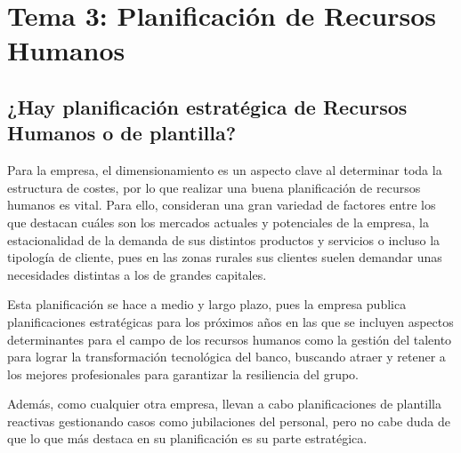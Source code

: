 %
%

\chapter{Tema 3: Planificación de Recursos Humanos}


\section{¿Hay planificación estratégica de Recursos Humanos o de plantilla?}

Para la empresa, el dimensionamiento es un aspecto clave al determinar toda la estructura de costes, por lo que realizar una buena planificación de recursos humanos es vital. Para ello, consideran una gran variedad de factores entre los que destacan cuáles son los mercados actuales y potenciales de la empresa, la estacionalidad de la demanda de sus distintos productos y servicios o incluso la tipología de cliente, pues en las zonas rurales sus clientes suelen demandar unas necesidades distintas a los de grandes capitales.

\vspace{0.5cm}
Esta planificación se hace a medio y largo plazo, pues la empresa publica planificaciones estratégicas para los próximos años en las que se incluyen aspectos determinantes para el campo de los recursos humanos como la gestión del talento para lograr la transformación tecnológica del banco, buscando atraer y retener a los mejores profesionales para garantizar la resiliencia del grupo.

\vspace{0.5cm}
Además, como cualquier otra empresa, llevan a cabo planificaciones de plantilla reactivas gestionando casos como jubilaciones del personal, pero no cabe duda de que lo que más destaca en su planificación es su parte estratégica.

